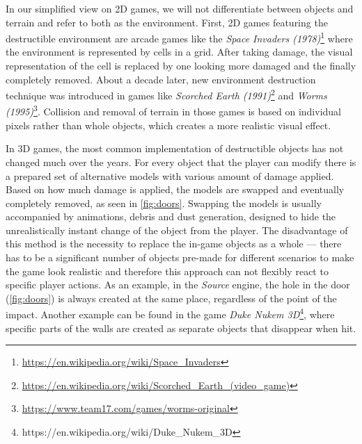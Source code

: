 In our simplified view on 2D games, we will not differentiate between objects and terrain and refer to both as the environment.
First,  2D games featuring the destructible environment are  arcade games like the \emph{Space Invaders (1978)}\footnote{\url{https://en.wikipedia.org/wiki/Space\_Invaders}}  where the environment is represented by cells in a grid. After taking damage, the visual representation of the cell is replaced by one looking more damaged and the finally completely removed. About a decade later, new environment destruction technique was introduced  in games like \emph{Scorched Earth (1991)}\footnote{\url{https://en.wikipedia.org/wiki/Scorched\_Earth\_(video\_game)}} and \emph{Worms (1995)}\footnote{\url{https://www.team17.com/games/worms-original}}. Collision and removal of terrain in those games is based on individual pixels rather than whole objects, which creates a more realistic visual effect. 

In 3D games, the most common implementation of destructible objects has not changed much over the years.  For every object that the player can modify there is a prepared set of alternative models with various amount of damage applied. Based on how much damage is applied, the models are swapped and eventually completely removed, as seen in \cref{fig:doors}. Swapping the models is usually accompanied by animations, debris and dust generation, designed to hide the unrealistically instant change of the object from the player. The disadvantage of this method is the necessity to replace the in-game objects as a whole --- there has to be a significant number of objects pre-made for different scenarios to make the game look realistic and therefore  this approach can not flexibly react to specific player actions. As an example, in the \emph{Source} engine, the hole in the door (\cref{fig:doors}) is always created at the same place, regardless of the point of the impact. Another example can be found in the game \emph{Duke Nukem 3D}\footnote{https://en.wikipedia.org/wiki/Duke\_Nukem\_3D}, where specific parts of the walls are created as separate objects that disappear when hit.

